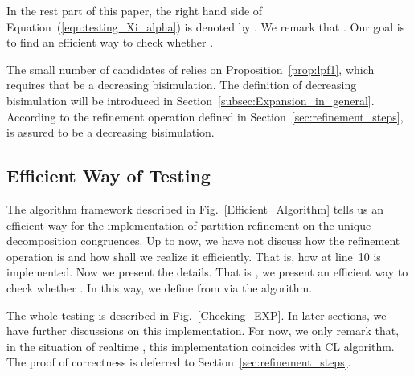 \documentclass{llncs}
\begin{document}
In the rest part of this paper,  the right hand side of Equation~(\ref{eqn:testing_Xi_alpha}) is denoted by . We remark that .  Our goal is to find an efficient way to check whether .

\begin{remark}
The small number of candidates of  relies on Proposition~\ref{prop:lpf1}, which requires that  be a decreasing bisimulation. The definition of decreasing bisimulation will be introduced in Section~\ref{subsec:Expansion_in_general}. According to the refinement operation defined in Section~\ref{sec:refinement_steps},   is assured to be a decreasing bisimulation.
\end{remark}

\subsection{Efficient Way of Testing }

The algorithm framework described in Fig.~\ref{Efficient_Algorithm} tells us an efficient way for the implementation of partition refinement on the unique decomposition congruences.  Up to now, we have not discuss how the refinement operation is and how shall we realize it efficiently. That is, how  at line~10 is implemented. Now we present the details.  That is , we present an efficient way to check whether . In this way, we define  from  via the algorithm.

The whole testing is described in Fig.~\ref{Checking_EXP}. In later sections, we have further discussions on this implementation.  For now, we only remark that, in the situation of realtime , this implementation coincides with CL algorithm.   The proof of correctness is deferred to Section~\ref{sec:refinement_steps}.
\end{document}
